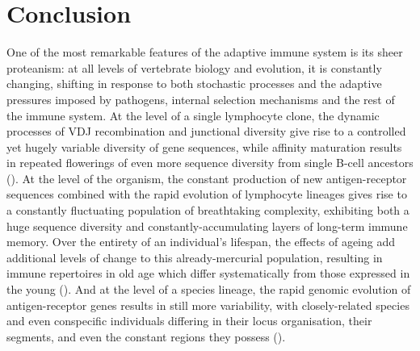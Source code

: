 \chapter*{Conclusion}  
\label{chap:conclusion}
\onehalfspacing

One of the most remarkable features of the adaptive immune system is its sheer proteanism: at all levels of vertebrate biology and evolution, it is constantly changing, shifting in response to both stochastic processes and the adaptive pressures imposed by pathogens, internal selection mechanisms and the rest of the immune system. At the level of a single lymphocyte clone, the dynamic processes of VDJ recombination and junctional diversity give rise to a controlled yet hugely variable diversity of gene sequences, while affinity maturation results in repeated flowerings of even more sequence diversity from single \naive B-cell ancestors (). At the level of the organism, the constant production of new antigen-receptor sequences combined with the rapid evolution of lymphocyte lineages gives rise to a constantly fluctuating population of breathtaking complexity, exhibiting both a huge \naive sequence diversity and constantly-accumulating layers of long-term immune memory. Over the entirety of an individual's lifespan, the effects of ageing add additional levels of change to this already-mercurial population, resulting in immune repertoires in old age which differ systematically from those expressed in the young (). And at the level of a species lineage, the rapid genomic evolution of antigen-receptor genes results in still more variability, with closely-related species and even conspecific individuals \parencite{corcoran2016igdiscover} differing in their locus organisation, their \vh segments, and even the constant regions they possess ().

